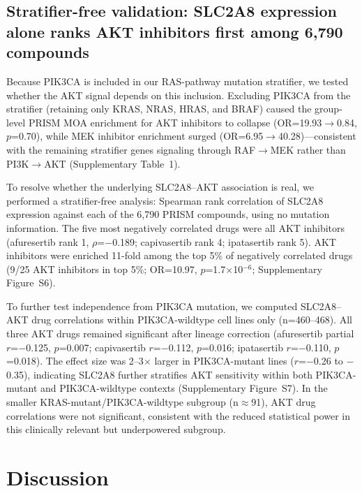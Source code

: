 \documentclass[12pt]{article}
\begin{document}
\subsection{Stratifier-free validation: SLC2A8 expression alone ranks AKT
inhibitors first among 6,790 compounds}

Because PIK3CA is included in our RAS-pathway mutation stratifier, we
tested whether the AKT signal depends on this inclusion. Excluding PIK3CA
from the stratifier (retaining only KRAS, NRAS, HRAS, and BRAF) caused the
group-level PRISM MOA enrichment for AKT inhibitors to collapse
(OR=19.93$\rightarrow$0.84, $p$=0.70), while MEK inhibitor enrichment
surged (OR=6.95$\rightarrow$40.28)---consistent with the remaining
stratifier genes signaling through RAF$\rightarrow$MEK rather than
PI3K$\rightarrow$AKT (Supplementary Table~1).

To resolve whether the underlying SLC2A8--AKT association is real, we
performed a stratifier-free analysis: Spearman rank correlation of SLC2A8
expression against each of the 6,790 PRISM compounds, using no mutation
information. The five most negatively correlated drugs were all AKT
inhibitors (afuresertib rank 1, $\rho$=$-$0.189; capivasertib rank 4;
ipatasertib rank 5). AKT inhibitors were enriched 11-fold among the top
5\% of negatively correlated drugs (9/25 AKT inhibitors in top 5\%;
OR=10.97, $p$=1.7$\times$10$^{-6}$; Supplementary Figure~S6).

To further test independence from PIK3CA mutation, we computed SLC2A8--AKT
drug correlations within PIK3CA-wildtype cell lines only (n=460--468).
All three AKT drugs remained significant after lineage correction
(afuresertib partial $r$=$-$0.125, $p$=0.007; capivasertib $r$=$-$0.112,
$p$=0.016; ipatasertib $r$=$-$0.110, $p$=0.018). The effect size was
2--3$\times$ larger in PIK3CA-mutant lines ($r$=$-$0.26 to $-$0.35),
indicating SLC2A8 further stratifies AKT sensitivity within both
PIK3CA-mutant and PIK3CA-wildtype contexts (Supplementary Figure~S7).
In the smaller KRAS-mutant/PIK3CA-wildtype subgroup (n$\approx$91), AKT
drug correlations were not significant, consistent with the reduced
statistical power in this clinically relevant but underpowered subgroup.

\section{Discussion}
\end{document}
